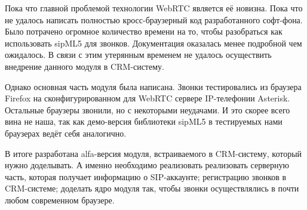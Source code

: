 \conclusion
Пока что главной проблемой технологии WebRTC является её новизна. Пока что не удалось написать полностью кросс-браузерный код разработанного софт-фона. Было потрачено огромное количество времени на то, чтобы разобраться как использовать sipML5 для звонков. Документация оказалась менее подробной чем ожидалось. В связи с этим утерянным временем не удалось осуществить внедрение данного модуля в CRM-систему.

Однако основная часть модуля была написана. Звонки тестировались из браузера Firefox на сконфигурированном для WebRTC сервере IP-телефонии Asterisk. Остальные браузеры звонили, но с некоторыми неудачами. И это скорее всего вина не наша, так как демо-версия библиотеки sipML5 в тестируемых нами браузерах ведёт себя аналогично.

В итоге разработана alfa-версия модуля, встраиваемого в CRM-систему, который нужно доделывать. А именно необходимо реализовать реализовать серверную часть, которая получает информацию о SIP-аккаунте; регистрацию звонков в CRM-системе; доделать ядро модуля так, чтобы звонки осуществлялись в почти любом современном браузере.